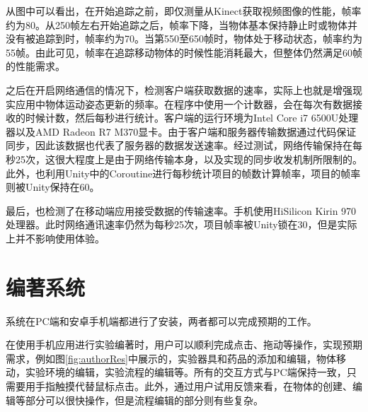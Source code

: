 从图中可以看出，在开始追踪之前，即仅测量从Kinect获取视频图像的性能，帧率约为80。从250帧左右开始追踪之后，帧率下降，当物体基本保持静止时或物体并没有被追踪到时，帧率约为70。当第550至650帧时，物体处于移动状态，帧率约为55帧。由此可见，帧率在追踪移动物体的时候性能消耗最大，但整体仍然满足60帧的性能需求。

之后在开启网络通信的情况下，检测客户端获取数据的速率，实际上也就是增强现实应用中物体运动姿态更新的频率。在程序中使用一个计数器，会在每次有数据接收的时候计数，然后每秒进行统计。客户端的运行环境为Intel Core i7 6500U处理器以及AMD Radeon R7 M370显卡。由于客户端和服务器传输数据通过代码保证同步，因此该数据也代表了服务器的数据发送速率。经过测试，网络传输保持在每秒25次，这很大程度上是由于网络传输本身，以及实现的同步收发机制所限制的。此外，也利用Unity中的Coroutine进行每秒统计项目的帧数计算帧率，项目的帧率则被Unity保持在60。

最后，也检测了在移动端应用接受数据的传输速率。手机使用HiSilicon Kirin 970处理器。此时网络通讯速率仍然为每秒25次，项目帧率被Unity锁在30，但是实际上并不影响使用体验。

\section{编著系统}
系统在PC端和安卓手机端都进行了安装，两者都可以完成预期的工作。

在使用手机应用进行实验编著时，用户可以顺利完成点击、拖动等操作，实现预期需求，例如图\ref{fig:authorRes}中展示的，实验器具和药品的添加和编辑，物体移动，实验环境的编辑，实验流程的编辑等。所有的交互方式与PC端保持一致，只需要用手指触摸代替鼠标点击。此外，通过用户试用反馈来看，在物体的创建、编辑等部分可以很快操作，但是流程编辑的部分则有些复杂。

